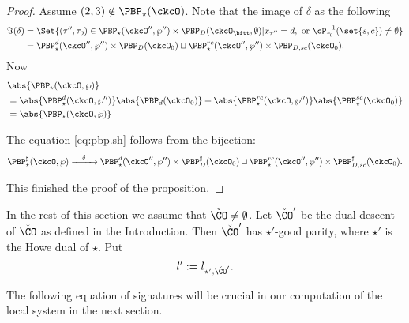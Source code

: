 \documentclass[unipcounting]{subfiles}
\begin{document}
\begin{proof}
Assume $(2,3)\notin \PBP_\star(\ckcO)$. 
Note that the image of $\delta$ as the following
\[
\begin{split}
\Im (\delta) & =
\Set{ (\tau'',\tau_0)  \in \PBP_\star(\ckcO'',\wp'')\times \PBP_D(\ckcO_\bftt,\emptyset)  |  x_{\tau''} = d, \text{ or }  \cP_{\tau_0}^{-1}(\set{s,c})\neq \emptyset } \\
& =  \PBP_\star^{d}(\ckcO'',\wp'')\times \PBP_D(\ckcO_0) 
\sqcup
\PBP_\star^{rc}(\ckcO'',\wp'')\times \PBP_{D,sc}(\ckcO_0) .
\end{split}
\]
Now 
\[
\begin{split}
 & \abs{\PBP_{\star}(\ckcO,\wp)}   \\
 & = \abs{\PBP_{\star}^d(\ckcO,\wp'')} \abs{\PBP_{d}(\ckcO_0)} 
 + \abs{\PBP_{\star}^{rc}(\ckcO,\wp'')} \abs{\PBP_{\star}^{sc}(\ckcO_0)} \\
 & = \abs{\PBP_{\star}(\ckcO,\wp)}   \\
\end{split}
\]

The equation \eqref{eq:pbp.sh} follows from the bijection:
\[
\PBP_\star^{\sharp}(\ckcO,\wp)
 \xrightarrow{\ \ \ \delta \ \ \ }  \PBP_\star^{d}(\ckcO'',\wp'')\times \PBP_D^\sharp(\ckcO_0) 
\sqcup
\PBP_\star^{rc}(\ckcO'',\wp'')\times \PBP_{D,sc}^\sharp(\ckcO_0) .
\]

This finished the proof of the proposition.
\end{proof}

In the rest of this section we assume that $\check \CO\neq \emptyset$.  Let $\check \CO'$ be the dual descent of $\check \CO$ as defined in the Introduction. Then $\check \CO'$ has $\star'$-good parity, where $\star'$ is the  Howe dual of $\star$. Put
\[
  l':=l_{\star', \check \CO'}.
\]







The following equation of signatures will be crucial in our computation of the local system in the next section. 
\end{document}
